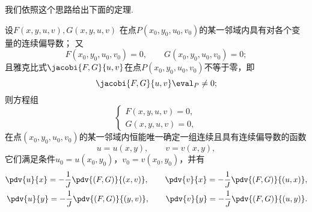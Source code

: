 我们依照这个思路给出下面的定理.
\begin{theorem}[隐函数存在定理3]\label{theorem:多元函数微分法.隐函数存在定理3}
设\(F(x,y,u,v),G(x,y,u,v)\)
在点\(P(x_0,y_0,u_0,v_0)\)的某一邻域内具有对各个变量的连续偏导数；
又\begin{equation*}
	F(x_0,y_0,u_0,v_0)=0, \qquad
	G(x_0,y_0,u_0,v_0)=0;
\end{equation*}
且雅克比式\(\jacobi{F,G}{u,v}\)在点\(P(x_0,y_0,u_0,v_0)\)不等于零，即\begin{equation*}
	\jacobi{F,G}{u,v}\eval_P \neq0;
\end{equation*}
则方程组\begin{equation*}
	\left\{ \begin{array}{c}
		F(x,y,u,v)=0, \\
		G(x,y,u,v)=0,
	\end{array} \right.
\end{equation*}
在点\((x_0,y_0,u_0,v_0)\)的某一邻域内恒能唯一确定一组连续且具有连续偏导数的函数
\begin{equation*}
	u=u(x,y), \qquad
	v=v(x,y),
\end{equation*}
它们满足条件\(u_0=u(x_0,y_0)\)，\(v_0=v(x_0,y_0)\)，并有
\begin{equation}\label{equation:多元函数微分法.隐函数存在定理3.一阶偏导数}
	\begin{split}
		\pdv{u}{x}
		= -\frac{1}{J} \pdv{(F,G)}{(x,v)},
		\qquad
		\pdv{v}{x}
		= -\frac{1}{J} \pdv{(F,G)}{(u,x)},
		\\
		\pdv{u}{y}
		= -\frac{1}{J} \pdv{(F,G)}{(y,v)},
		\qquad
		\pdv{v}{y}
		= -\frac{1}{J} \pdv{(F,G)}{(u,y)}.
	\end{split}
\end{equation}
\end{theorem}
